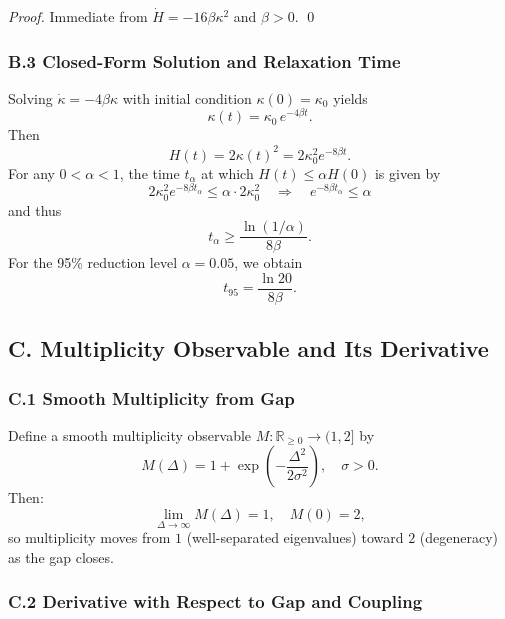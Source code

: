 \documentclass[11pt]{article}
\begin{document}
\emph{Proof.} Immediate from $\dot H = -16\beta\kappa^2$ and $\beta>0$. \qed

\subsubsection*{B.3 Closed-Form Solution and Relaxation Time}

Solving $\dot\kappa = -4\beta\kappa$ with initial condition $\kappa(0)=\kappa_0$ yields
\begin{equation}
  \kappa(t) = \kappa_0\,e^{-4\beta t}.
\end{equation}
Then
\[
  H(t) = 2\kappa(t)^2 = 2\kappa_0^2 e^{-8\beta t}.
\]
For any $0<\alpha<1$, the time $t_\alpha$ at which $H(t)\le \alpha H(0)$ is given by
\[
  2\kappa_0^2 e^{-8\beta t_\alpha} \le \alpha \cdot 2\kappa_0^2
  \quad\Rightarrow\quad
  e^{-8\beta t_\alpha} \le \alpha
\]
and thus
\begin{equation}
  t_\alpha \ge \frac{\ln(1/\alpha)}{8\beta}.
\end{equation}
For the 95\% reduction level $\alpha = 0.05$, we obtain
\begin{equation}
  t_{95}
  = \frac{\ln 20}{8\beta}.
\end{equation}

\subsection*{C. Multiplicity Observable and Its Derivative}

\subsubsection*{C.1 Smooth Multiplicity from Gap}

Define a smooth multiplicity observable $M:\mathbb{R}_{\ge 0}\to(1,2]$ by
\begin{equation}
  M(\Delta) = 1 + \exp\left(-\frac{\Delta^2}{2\sigma^2}\right),
  \quad \sigma>0.
\end{equation}
Then:
\[
  \lim_{\Delta\to\infty} M(\Delta) = 1,
  \quad
  M(0) = 2,
\]
so multiplicity moves from $1$ (well-separated eigenvalues) toward $2$ (degeneracy) as the gap closes.

\subsubsection*{C.2 Derivative with Respect to Gap and Coupling}
\end{document}
